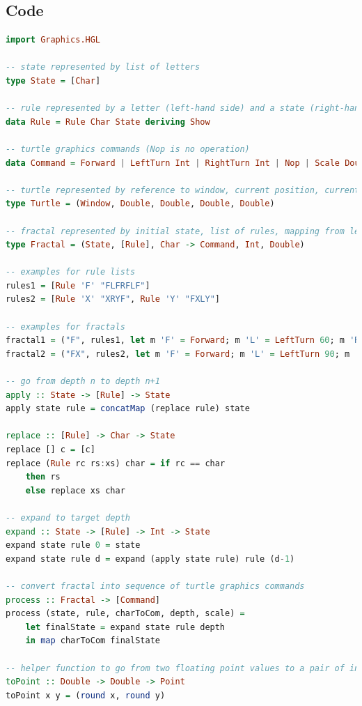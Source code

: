 \documentclass{article}
\begin{document}
\subsection{Code} \label{Code}
\begin{lstlisting}[language=Haskell]
import Graphics.HGL

-- state represented by list of letters
type State = [Char]

-- rule represented by a letter (left-hand side) and a state (right-hand side)
data Rule = Rule Char State deriving Show

-- turtle graphics commands (Nop is no operation)
data Command = Forward | LeftTurn Int | RightTurn Int | Nop | Scale Double | Backward deriving Show 

-- turtle represented by reference to window, current position, current angle, current length
type Turtle = (Window, Double, Double, Double, Double)

-- fractal represented by initial state, list of rules, mapping from letters to commands, target depth, initial length
type Fractal = (State, [Rule], Char -> Command, Int, Double)

-- examples for rule lists
rules1 = [Rule 'F' "FLFRFLF"]
rules2 = [Rule 'X' "XRYF", Rule 'Y' "FXLY"]

-- examples for fractals
fractal1 = ("F", rules1, let m 'F' = Forward; m 'L' = LeftTurn 60; m 'R' = RightTurn 120 in m)
fractal2 = ("FX", rules2, let m 'F' = Forward; m 'L' = LeftTurn 90; m 'R' = RightTurn 90; m _ = Nop in m)

-- go from depth n to depth n+1
apply :: State -> [Rule] -> State
apply state rule = concatMap (replace rule) state  

replace :: [Rule] -> Char -> State
replace [] c = [c]
replace (Rule rc rs:xs) char = if rc == char
    then rs
    else replace xs char
 
-- expand to target depth
expand :: State -> [Rule] -> Int -> State
expand state rule 0 = state
expand state rule d = expand (apply state rule) rule (d-1)

-- convert fractal into sequence of turtle graphics commands
process :: Fractal -> [Command]
process (state, rule, charToCom, depth, scale) =  
    let finalState = expand state rule depth
    in map charToCom finalState

-- helper function to go from two floating point values to a pair of integers
toPoint :: Double -> Double -> Point
toPoint x y = (round x, round y)


\end{lstlisting}
\end{document}
